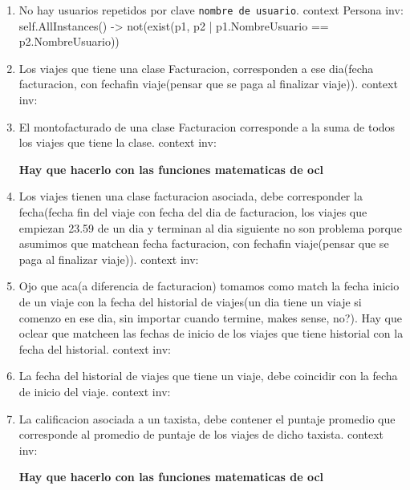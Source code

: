\begin{enumerate}
	\item \begin{ocl}{No hay usuarios repetidos por clave \texttt{nombre de usuario}.}
		  context Persona
		  inv: self.AllInstances() -> not(exist(p1, p2 | p1.NombreUsuario == p2.NombreUsuario))
		\end{ocl}	

	\item \begin{ocl}{Los viajes que tiene una clase Facturacion, corresponden a ese dia(fecha facturacion, con fechafin viaje(pensar que se paga al finalizar viaje)).}
		  context 
		  inv: 
		\end{ocl}

	\item \begin{ocl}{El montofacturado de una clase Facturacion corresponde a la suma de todos los viajes que tiene la clase.}
		  context 
		  inv: 
		\end{ocl}
		\textbf{Hay que hacerlo con las funciones matematicas de ocl}

	\item \begin{ocl}{Los viajes tienen una clase facturacion asociada, debe corresponder la fecha(fecha fin del viaje con fecha del dia de facturacion, los viajes que empiezan 23.59 de un dia y terminan al dia siguiente no son problema porque asumimos que matchean fecha facturacion, con fechafin viaje(pensar que se paga al finalizar viaje)).}
		  context 
		  inv: 
		\end{ocl}

	\item \begin{ocl}{Ojo que aca(a diferencia de facturacion) tomamos como match la fecha inicio de un viaje con la fecha del historial de viajes(un dia tiene un viaje si comenzo en ese dia, sin importar cuando termine, makes sense, no?). Hay que oclear que matcheen las fechas de inicio de los viajes que tiene historial con la fecha del historial.}
		  context 
		  inv: 
		\end{ocl}

	\item \begin{ocl}{La fecha del historial de viajes que tiene un viaje, debe coincidir con la fecha de inicio del viaje.}
		  context 
		  inv: 
		\end{ocl}

	\item \begin{ocl}{La calificacion asociada a un taxista, debe contener el puntaje promedio que corresponde al promedio de puntaje de los viajes de dicho taxista.}
		  context 
		  inv: 
		\end{ocl}
		\textbf{Hay que hacerlo con las funciones matematicas de ocl}

\end{enumerate}
